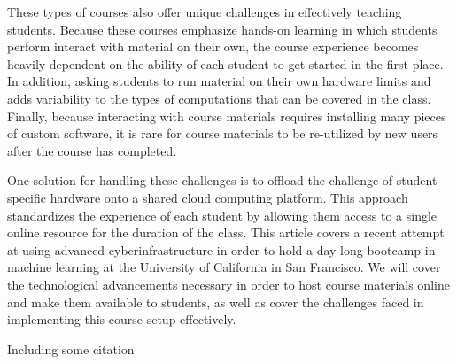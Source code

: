 These types of courses also offer unique challenges in effectively teaching
students. Because these courses emphasize hands-on learning in which students
perform interact with material on their own, the course experience becomes
heavily-dependent on the ability of each student to get started in the first
place. In addition, asking students to run material on their own hardware limits
and adds variability to the types of computations that can be covered in the
class. Finally, because interacting with course materials requires installing
many pieces of custom software, it is rare for course materials to be
re-utilized by new users after the course has completed.

One solution for handling these challenges is to offload the challenge of
student-specific hardware onto a shared cloud computing platform. This approach
standardizes the experience of each student by allowing them access to a single
online resource for the duration of the class. This article covers a recent
attempt at using advanced cyberinfrastructure in order to hold a day-long
bootcamp in machine learning at the University of California in San Francisco.
We will cover the technological advancements necessary in order to host course
materials online and make them available to students, as well as cover the
challenges faced in implementing this course setup effectively.

 Including some citation \cite{Lamport:LaTeX}
